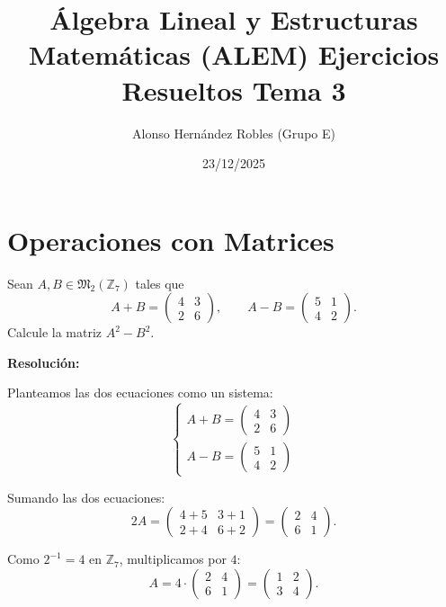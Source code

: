 \documentclass[a4paper,12pt]{article}
\title{Álgebra Lineal y Estructuras Matemáticas (ALEM) Ejercicios Resueltos Tema 3}
\author{Alonso Hernández Robles (Grupo E)}
\date{23/12/2025}
\begin{document}
\maketitle

\tableofcontents
\newpage

\section{Operaciones con Matrices}

\begin{ejercicio}[title=Ejercicio 1]
Sean $A,B \in \mathfrak{M}_2(\mathbb{Z}_7)$ tales que
\[
A + B = 
\begin{pmatrix}
4 & 3\\
2 & 6
\end{pmatrix}, 
\qquad
A - B =
\begin{pmatrix}
5 & 1\\
4 & 2
\end{pmatrix}.
\]
Calcule la matriz $A^2 - B^2$.

\tcblower
\textbf{Resolución:}

Planteamos las dos ecuaciones como un sistema:
\[
\begin{cases}
A + B = \begin{pmatrix}4 & 3\\[2pt] 2 & 6\end{pmatrix}\\[4pt]
A - B = \begin{pmatrix}5 & 1\\[2pt] 4 & 2\end{pmatrix}
\end{cases}
\]

Sumando las dos ecuaciones:
\[
2A =
\begin{pmatrix}
4+5 & 3+1\\[2pt]
2+4 & 6+2
\end{pmatrix}
=
\begin{pmatrix}
2 & 4\\[2pt]
6 & 1
\end{pmatrix}.
\]

Como $2^{-1}=4$ en $\mathbb{Z}_7$, multiplicamos por $4$:
\[
A = 4 \cdot 
\begin{pmatrix}
2 & 4\\[2pt]
6 & 1
\end{pmatrix}
=
\begin{pmatrix}
1 & 2\\[2pt]
3 & 4
\end{pmatrix}.
\]


\end{ejercicio}
\end{document}
